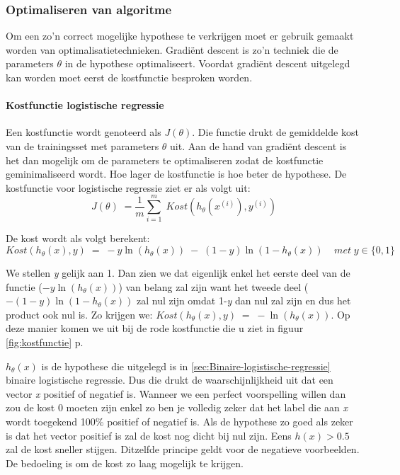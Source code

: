\subsubsection{Optimaliseren van algoritme}
\label{sec:Optimaliseren-algoritme}
Om een zo'n correct mogelijke hypothese te verkrijgen moet er gebruik gemaakt worden van optimalisatietechnieken. Gradiënt descent is zo'n techniek die de parameters $\theta$ in de hypothese optimaliseert. Voordat gradiënt descent uitgelegd kan worden moet eerst de kostfunctie besproken worden. 

\paragraph{Kostfunctie logistische regressie}
\label{par:kostfunctie-log}
Een kostfunctie wordt genoteerd als $J(\theta)$. Die functie drukt de gemiddelde kost van de trainingsset met parameters $\theta$ uit. Aan de hand van gradiënt descent is het dan mogelijk om de parameters te optimaliseren zodat de kostfunctie geminimaliseerd wordt. Hoe lager de kostfunctie is hoe beter de hypothese.
De kostfunctie voor logistische regressie ziet er als volgt uit: 
$$ 
J(\theta) \; = \frac{1}{m}\sum_{i=1}^{m} \;   Kost (h_{\theta}(x^{(i)}), y^{(i)} )  
$$

De kost wordt als volgt berekent:
$$Kost (h_{\theta}(x), y) \; = \; -y\ln(h_{\theta}(x)) \;- \;(1-y) \ln(1-h_{\theta}(x))  \;\;\;\; met \; y \in \{0,1\}$$

We stellen \textit{y} gelijk aan 1. Dan zien we dat eigenlijk enkel het eerste deel van de functie ($-y\ln(h_{\theta}(x))$) van belang zal zijn want het tweede deel ($- (1-y) \ln(1-h_{\theta}(x))$ zal nul zijn omdat 1-\textit{y} dan nul zal zijn en dus het product ook nul is. Zo krijgen we: 
\newline $Kost (h_{\theta}(x), y) \; = \; -\ln(h_{\theta}(x))$. Op deze manier komen we uit bij de rode kostfunctie die u ziet in figuur \ref{fig:kostfunctie} p\pageref{fig:kostfunctie}.

$h_{\theta}(x)$ is de hypothese die uitgelegd is in \ref{sec:Binaire-logistische-regressie} binaire logistische regressie. Dus die drukt de waarschijnlijkheid uit dat een vector \textit{x} positief of negatief is. Wanneer we een perfect voorspelling willen dan zou de kost 0 moeten zijn enkel zo ben je volledig zeker dat het label die aan \textit{x} wordt toegekend 100\% positief of negatief is. Als de hypothese zo goed als zeker is dat het vector positief is zal de kost nog dicht bij nul zijn. Eens $h(x) > 0.5$ zal de kost sneller stijgen. Ditzelfde principe geldt voor de negatieve voorbeelden. De bedoeling is om de kost zo laag mogelijk te krijgen.

